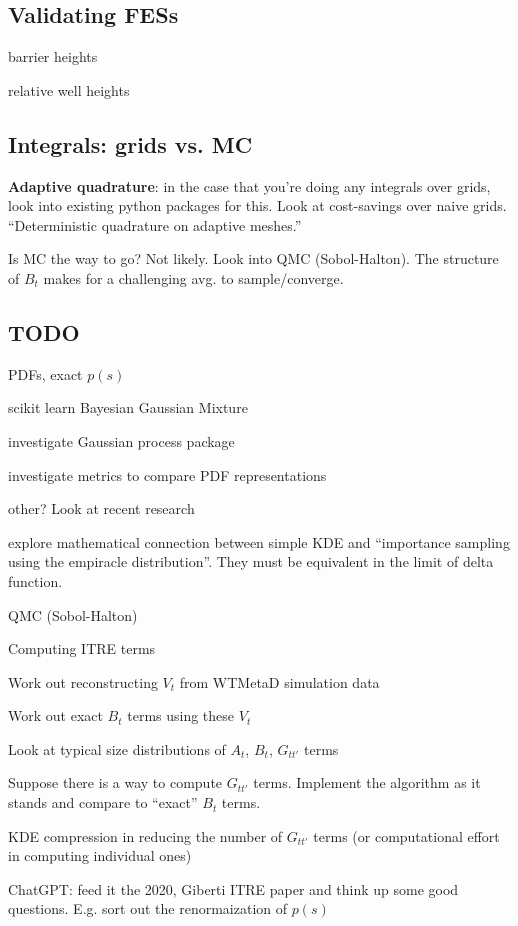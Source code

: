 \subsection{Validating FESs}
\begin{enumeratec}
    \item barrier heights
    \item relative well heights
\end{enumeratec}

\subsection{Integrals: grids vs. MC}
\textbf{Adaptive quadrature}: in the case that you're doing any integrals over grids, look into existing python packages for this.  Look at cost-savings over naive grids.  ``Deterministic quadrature on adaptive meshes.''

Is MC the way to go?  Not likely.  Look into QMC (Sobol-Halton).  The structure of $B_t$ makes for a challenging avg. to sample/converge.

\subsection{TODO}
PDFs, exact $p(s)$
\begin{itemizec}
    \item scikit learn Bayesian Gaussian Mixture
    \item investigate Gaussian process package
    \item investigate metrics to compare PDF representations
    \item other?  Look at recent research
    \item explore mathematical connection between simple KDE and ``importance sampling using the empiracle distribution''.  They must be equivalent in the limit of delta function.
    \item QMC (Sobol-Halton)
\end{itemizec}
Computing ITRE terms
\begin{itemizec}
    \item Work out reconstructing $V_t$ from WTMetaD simulation data
    \item Work out exact $B_t$ terms using these $V_t$
    \item Look at typical size distributions of $A_t$, $B_t$, $G_{tt'}$ terms
    \item Suppose there is a way to compute $G_{tt'}$ terms.  Implement the algorithm as it stands and compare to ``exact'' $B_t$ terms.
    \item KDE compression in reducing the number of $G_{tt'}$ terms (or computational effort in computing individual ones)
    \item ChatGPT:  feed it the 2020, Giberti ITRE paper and think up some good questions.  E.g. sort out the renormaization of $p(s)$
\end{itemizec}
